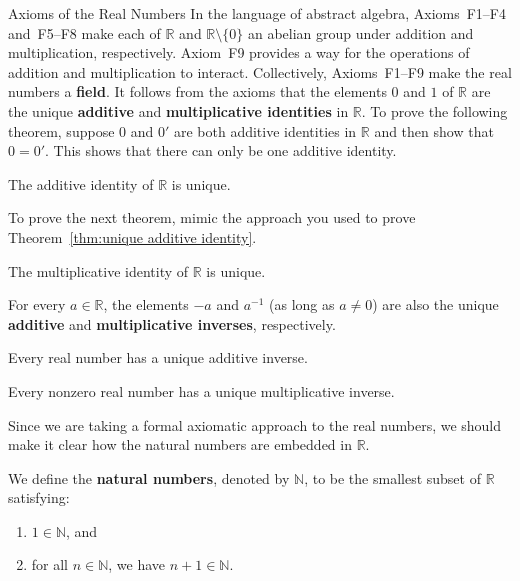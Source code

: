 \begin{section}{Axioms of the Real Numbers}
In the language of abstract algebra, Axioms~F1--F4 and~F5--F8 make each of $\mathbb{R}$ and $\mathbb{R}\setminus\{0\}$ an abelian group under addition and multiplication, respectively. Axiom~F9 provides a way for the operations of addition and multiplication to interact.  Collectively, Axioms~F1--F9 make the real numbers a \textbf{field}.  It follows from the axioms that the elements $0$ and $1$ of $\mathbb{R}$ are the unique \textbf{additive} and \textbf{multiplicative identities} in $\mathbb{R}$. To prove the following theorem, suppose $0$ and $0'$ are both additive identities in $\mathbb{R}$ and then show that $0=0'$. This shows that there can only be one additive identity. %

\begin{theorem}\label{thm:unique additive identity}
The additive identity of $\mathbb{R}$ is unique.
\end{theorem}

To prove the next theorem, mimic the approach you used to prove Theorem~\ref{thm:unique additive identity}.

\begin{theorem}\label{thm:unique multiplicative identity}
The multiplicative identity of $\mathbb{R}$ is unique.
\end{theorem}

For every $a\in\mathbb{R}$, the elements $-a$ and $a^{-1}$ (as long as $a\neq 0$) are also the unique \textbf{additive} and \textbf{multiplicative inverses}, respectively. 

\begin{theorem}\label{thm:unique additive inverse}
Every real number has a unique additive inverse.
\end{theorem}

\begin{theorem}
Every nonzero real number has a unique multiplicative inverse.
\end{theorem}

Since we are taking a formal axiomatic approach to the real numbers, we should make it clear how the natural numbers are embedded in $\mathbb{R}$.

\begin{definition}
We define the \textbf{natural numbers}, denoted by $\mathbb{N}$, to be the smallest subset of $\mathbb{R}$ satisfying:
\begin{enumerate}[label=\textrm{(\alph*)}]
\item $1\in\mathbb{N}$, and
\item for all $n\in\mathbb{N}$, we have $n+1\in\mathbb{N}$.
\end{enumerate}
\end{definition}


\end{section}
